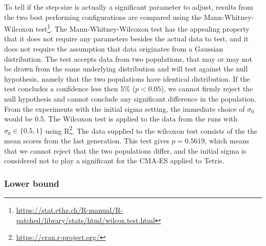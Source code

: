 To tell if the step-size is actually a significant parameter to adjust, results from 
the two best performing configurations are compared using the Mann-Whitney-Wilcoxon test\footnote{\url{https://stat.ethz.ch/R-manual/R-patched/library/stats/html/wilcox.test.html}}.
The Mann-Whitney-Wilcoxon test has the appealing property that it does not require any parameters
besides the actual data to test, and it does not require the assumption that data originates 
from a Gaussian distribution. The test accepts data from two populations, that may or may not 
be drawn from the same underlying distribution and will test against the null hypothesis, 
namely that the two populations have identical distribution. If the test concludes a 
confidence less then $5\%$ ($p < 0.05$), we cannot firmly reject the null hypothesis 
and cannot conclude any significant difference in the population. From the experiments
with the initial sigma setting, the immediate choice of $\sigma_0$ would be 0.5.
The Wilcoxon test is applied to the data from the runs with $\sigma_0 \in \{0.5, 1\}$
using R\footnote{\url{https://cran.r-project.org/}}. The data supplied
to the wilcoxon test consists of the the mean scores from the last generation.
This test gives $p=0.5619$, which means that we cannot reject that the two 
populations differ, and the initial sigma is considered not to play a significant 
for the CMA-ES applied to Tetris.

\subsubsection{Lower bound}

